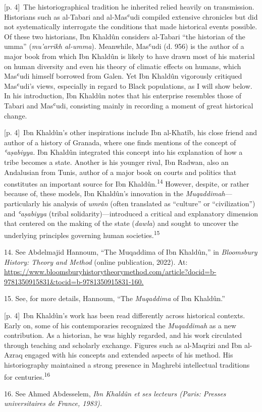 \documentclass[10pt,a4paper]{article}
\begin{document}
{\scriptsize\color{gray} [p. 4]}\ The historiographical tradition he inherited relied heavily on transmission. Historians such as al-Tabari and al-Masʿudi compiled extensive chronicles but did not systematically interrogate the conditions that made historical events possible. Of these two historians, Ibn Khaldûn considers al-Tabari “the historian of the umma” (\textit{mu’arrikh al-umma}). Meanwhile, Masʿudi (d. 956) is the author of a major book from which Ibn Khaldûn is likely to have drawn most of his material on human diversity and even his theory of climatic effects on humans, which Masʿudi himself borrowed from Galen. Yet Ibn Khaldûn vigorously critiqued Masʿudi’s views, especially in regard to Black populations, as I will show below. In his introduction, Ibn Khaldûn notes that his enterprise resembles those of Tabari and Masʿudi, consisting mainly in recording a moment of great historical change.\par
{\scriptsize\color{gray} [p. 4]}\ Ibn Khaldûn’s other inspirations include Ibn al-Khatîb, his close friend and author of a history of Granada, where one finds mentions of the concept of \textit{ʿaṣabiyya.} Ibn Khaldûn integrated this concept into his explanation of how a tribe becomes a state. Another is his younger rival, Ibn Radwan, also an Andalusian from Tunis, author of a major book on courts and politics that constitutes an important source for Ibn Khaldûn.\nobreak\textsuperscript{14} However, despite, or rather because of, these models, Ibn Khaldûn’s innovation in the \textit{Muqaddimah}—particularly his analysis of \textit{umrân} (often translated as “culture” or “civilization”) and \textit{ʿaṣabiyya} (tribal solidarity)—introduced a critical and explanatory dimension that centered on the making of the state (\textit{dawla}) and sought to uncover the underlying principles governing human societies.\nobreak\textsuperscript{15}\par{\small 14. See Abdelmajid Hannoum, “The Muqaddima of Ibn Khaldûn,” in \textit{Bloomsbury History: Theory and Method} (online publication, 2022). At: \url{https://www.bloomsburyhistorytheorymethod.com/article?docid=b-9781350915831&tocid=b-9781350915831-160.}\par}{\small 15. See, for more details, Hannoum, “The \textit{Muqaddima} of Ibn Khaldûn.”\par}
{\scriptsize\color{gray} [p. 4]}\ Ibn Khaldûn’s work has been read differently across historical contexts. Early on, some of his contemporaries recognized the \textit{Muqaddimah} as a new contribution. As a historian, he was highly regarded, and his work circulated through teaching and scholarly exchange. Figures such as al-Maqrizi and Ibn al-Azraq engaged with his concepts and extended aspects of his method. His historiography maintained a strong presence in Maghrebi intellectual traditions for centuries.\nobreak\textsuperscript{16}\par{\small 16. See Ahmed Abdesselem, \textit{Ibn Khaldûn et ses lecteurs (Paris: Presses universitaires de France, 1983).}\par}
\end{document}
